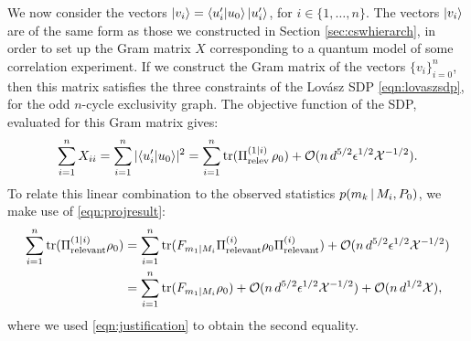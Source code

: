 We now consider the vectors
$\ket{v_i}=\bra{u'_i}\ket{u_0}\ket{u'_i}$,
for $i\in\{1,\dots, n\}$. The vectors $\ket{v_i}$ are of the same form as those we constructed in Section \ref{sec:cswhierarch}, in order to set up the Gram matrix $X$ corresponding to a quantum model of some correlation experiment. If we construct the Gram matrix of the vectors $\{v_i\}_{i=0}^n$, then this matrix satisfies the three constraints of the Lovász SDP \ref{eqn:lovaszsdp}, for the odd $n$-cycle exclusivity graph. The objective function of the SDP, evaluated for this Gram matrix gives:
\begin{equation*}
\sum_{i=1}^n X_{ii} = \sum_{i=1}^n \vert \langle u'_i\vert u_0\rangle \vert^2 = \sum_{i=1}^n\operatorname{tr}(\Pi_{\text{relev}}^{(1\vert i)}\thinspace\rho_0)+\mathcal{O}(n\thinspace d^{5/2}\epsilon^{1/2}\mathcal{X}^{-1/2}).
\end{equation*}
To relate this linear combination to the observed statistics $p(m_k\thinspace\vert\thinspace M_i,P_0)$, we make use of \ref{eqn:projresult}:
\begin{equation*}
\begin{split}
\sum_{i=1}^n\operatorname{tr}(\Pi_{\text{relevant}}^{(1\vert i)}\rho_0) & =\sum_{i=1}^n\operatorname{tr}(F_{m_1\vert M_i}\Pi_{\text{relevant}}^{(i)}\rho_0\Pi_{\text{relevant}}^{(i)})+\mathcal{O}(n\thinspace d^{5/2}\epsilon^{1/2}\mathcal{X}^{-1/2}) \\  & =\sum_{i=1}^n\operatorname{tr}(F_{m_1\vert M_i}\rho_0)+\mathcal{O}(n\thinspace d^{5/2}\epsilon^{1/2}\mathcal{X}^{-1/2})+\mathcal{O}(n\thinspace d^{1/2}\mathcal{X}),
\end{split}
\end{equation*}
where we used \ref{eqn:justification} to obtain the second equality.

